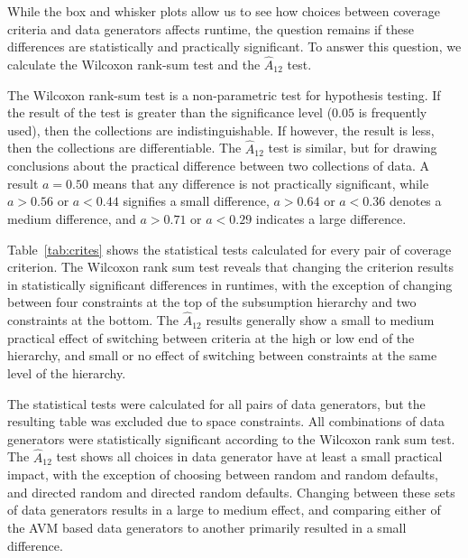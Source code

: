 
While the box and whisker plots allow us to see how choices between coverage criteria and data generators affects
runtime, the question remains if these differences are statistically and practically significant. To answer this
question, we calculate the Wilcoxon rank-sum test and the $\hat{A}_{12}$ test.

The Wilcoxon rank-sum test is a non-parametric test for hypothesis testing.  If the result of the test is greater than
the significance level ($0.05$ is frequently used), then the collections are indistinguishable.  If however, the result
is less, then the collections are differentiable.  The $\hat{A}_{12}$ test is similar, but for drawing conclusions about
the practical difference between two collections of data.  A result $a=0.50$ means that any difference is not
practically significant, while $a>0.56$ or $a<0.44$ signifies a small difference, $a>0.64$ or $a<0.36$ denotes a medium
difference, and $a>0.71$ or $a<0.29$ indicates a large difference.

Table~\ref{tab:crites} shows the statistical tests calculated for every pair of coverage criterion. The Wilcoxon rank
sum test reveals that changing the criterion results in statistically significant differences in runtimes, with the
exception of changing between four constraints at the top of the subsumption hierarchy and two constraints at the
bottom.  The $\hat{A}_{12}$ results generally show a small to medium practical effect of switching between criteria at
the high or low end of the hierarchy, and small or no effect of switching between constraints at the same level of the
hierarchy.

The statistical tests were calculated for all pairs of data generators, but the resulting table was excluded due to
space constraints. All combinations of data generators were statistically significant according to the Wilcoxon rank sum
test. The $\hat{A}_{12}$ test shows all choices in data generator have at least a small practical impact, with the
exception of choosing between random and random defaults, and directed random and directed random defaults.  Changing
between these sets of data generators results in a large to medium effect, and comparing either of the AVM based data
generators to another primarily resulted in a small difference.
